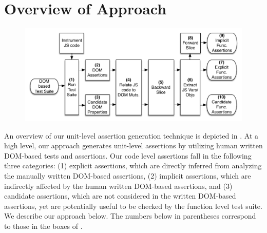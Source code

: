 \section{Overview of Approach} \label{Sec:approach}

\begin{figure}[!t]
  \centering
  \includegraphics[width=1\hsize]{fig/approachDiagram}
  \label{Fig:approachDiagram}
\end{figure}
An overview of our unit-level assertion generation technique is depicted in .
At a high level, our approach generates unit-level assertions by utilizing human written DOM-based tests and assertions. Our code level assertions fall in the following three categories: (1) explicit assertions, which are directly inferred from analyzing the manually written DOM-based assertions, (2) implicit assertions, which are indirectly affected by the human written DOM-based assertions, and (3) candidate assertions, which are not considered in the written DOM-based assertions, yet are potentially useful to be checked by the function level test suite. We describe our approach below. The numbers below in parentheses correspond to those in the boxes of .

